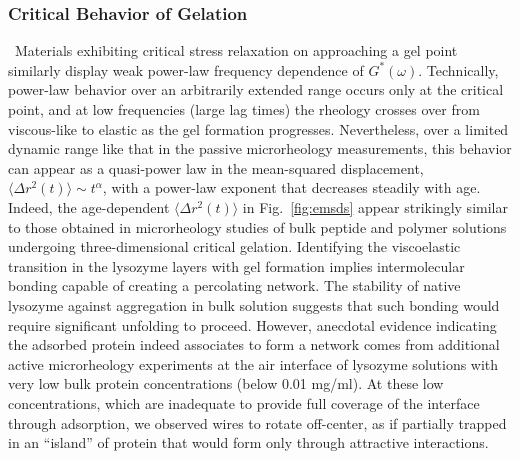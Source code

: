 \subsubsection{Critical Behavior of Gelation}~Materials exhibiting critical stress relaxation on approaching a gel point similarly display weak power-law frequency dependence of $G^*(\omega)$.\cite{Winter1986}  Technically, power-law behavior over an arbitrarily extended range occurs only at the critical point, and at low frequencies (large lag times) the rheology crosses over from viscous-like to elastic as the gel formation progresses.\cite{Winter1986,Veerman2006}  Nevertheless, over a limited dynamic range like that in the passive microrheology measurements, this behavior can appear as a quasi-power law in the mean-squared displacement, $\langle \Delta r^2(t) \rangle \sim t^{\alpha}$, with a power-law exponent that decreases steadily with age.   Indeed, the age-dependent $\langle \Delta r^2(t) \rangle$ in Fig.~\ref{fig:emsds} appear strikingly similar to those obtained in microrheology studies of bulk peptide and polymer solutions undergoing three-dimensional critical gelation.\cite{Veerman2006,Larsen2008}  Identifying the viscoelastic transition in the lysozyme layers with gel formation implies intermolecular bonding capable of creating a percolating network.  The stability of native lysozyme against aggregation in bulk solution suggests that such bonding would require significant unfolding to proceed.  However, anecdotal evidence indicating the adsorbed protein indeed associates to form a network comes from additional active microrheology experiments at the air interface of lysozyme solutions with very low bulk protein concentrations (below 0.01 mg/ml).  At these low concentrations, which are inadequate to provide full coverage of the interface through adsorption, we observed wires to rotate off-center, as if partially trapped in an ``island'' of protein that would form only through attractive interactions.  

